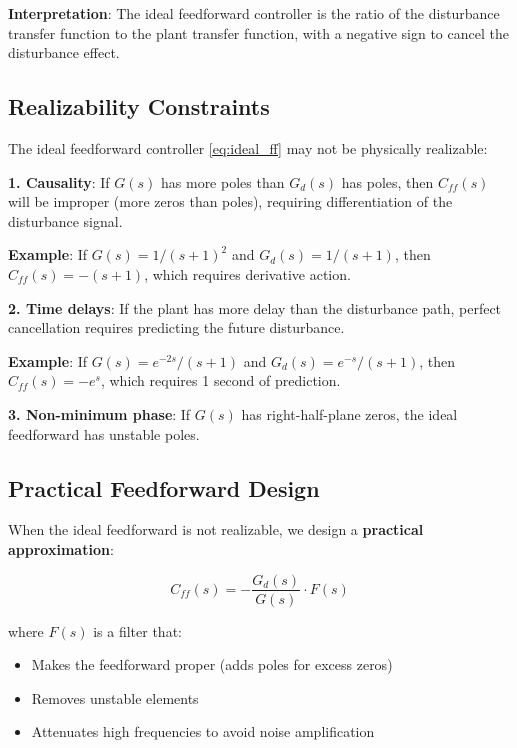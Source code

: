 \textbf{Interpretation}: The ideal feedforward controller is the ratio of the disturbance transfer function to the plant transfer function, with a negative sign to cancel the disturbance effect.

\subsection{Realizability Constraints}
\label{subsec:ff_realizability}

The ideal feedforward controller \eqref{eq:ideal_ff} may not be physically realizable:

\textbf{1. Causality}: If $G(s)$ has more poles than $G_d(s)$ has poles, then $C_{ff}(s)$ will be improper (more zeros than poles), requiring differentiation of the disturbance signal.

\textbf{Example}: If $G(s) = 1/(s+1)^2$ and $G_d(s) = 1/(s+1)$, then $C_{ff}(s) = -(s+1)$, which requires derivative action.

\textbf{2. Time delays}: If the plant has more delay than the disturbance path, perfect cancellation requires predicting the future disturbance.

\textbf{Example}: If $G(s) = e^{-2s}/(s+1)$ and $G_d(s) = e^{-s}/(s+1)$, then $C_{ff}(s) = -e^{s}$, which requires 1 second of prediction.

\textbf{3. Non-minimum phase}: If $G(s)$ has right-half-plane zeros, the ideal feedforward has unstable poles.

\subsection{Practical Feedforward Design}
\label{subsec:practical_ff}

When the ideal feedforward is not realizable, we design a \textbf{practical approximation}:

\begin{equation}
C_{ff}(s) = -\frac{G_d(s)}{G(s)} \cdot F(s)
\end{equation}

where $F(s)$ is a filter that:
\begin{itemize}
    \item Makes the feedforward proper (adds poles for excess zeros)
    \item Removes unstable elements
    \item Attenuates high frequencies to avoid noise amplification
\end{itemize}

